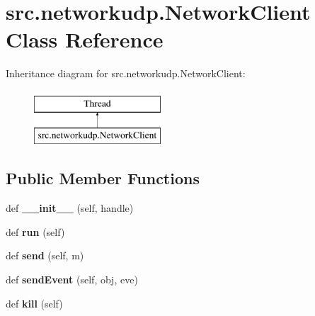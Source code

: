 \hypertarget{classsrc_1_1networkudp_1_1_network_client}{}\section{src.\+networkudp.\+Network\+Client Class Reference}
\label{classsrc_1_1networkudp_1_1_network_client}
Inheritance diagram for src.\+networkudp.\+Network\+Client\+:\begin{figure}[H]
\begin{center}
\leavevmode
\includegraphics[height=2.000000cm]{classsrc_1_1networkudp_1_1_network_client}
\end{center}
\end{figure}
\subsection*{Public Member Functions}
\begin{DoxyCompactItemize}
\item 
\hypertarget{classsrc_1_1networkudp_1_1_network_client_a30b40ebc598599f405162c742d8ba886}{}\label{classsrc_1_1networkudp_1_1_network_client_a30b40ebc598599f405162c742d8ba886} 
def {\bfseries \+\_\+\+\_\+init\+\_\+\+\_\+} (self, handle)
\item 
\hypertarget{classsrc_1_1networkudp_1_1_network_client_ae3e8fe50b963e813333bfb30069327e3}{}\label{classsrc_1_1networkudp_1_1_network_client_ae3e8fe50b963e813333bfb30069327e3} 
def {\bfseries run} (self)
\item 
\hypertarget{classsrc_1_1networkudp_1_1_network_client_aa1041d91d3544565d54b81f199335c8c}{}\label{classsrc_1_1networkudp_1_1_network_client_aa1041d91d3544565d54b81f199335c8c} 
def {\bfseries send} (self, m)
\item 
\hypertarget{classsrc_1_1networkudp_1_1_network_client_a184a0dc3819bd1927cd99c6b1d6fe645}{}\label{classsrc_1_1networkudp_1_1_network_client_a184a0dc3819bd1927cd99c6b1d6fe645} 
def {\bfseries send\+Event} (self, obj, eve)
\item 
\hypertarget{classsrc_1_1networkudp_1_1_network_client_a38b3e8ed3fa5e7a018de0ceece270e68}{}\label{classsrc_1_1networkudp_1_1_network_client_a38b3e8ed3fa5e7a018de0ceece270e68} 
def {\bfseries kill} (self)
\end{DoxyCompactItemize}
